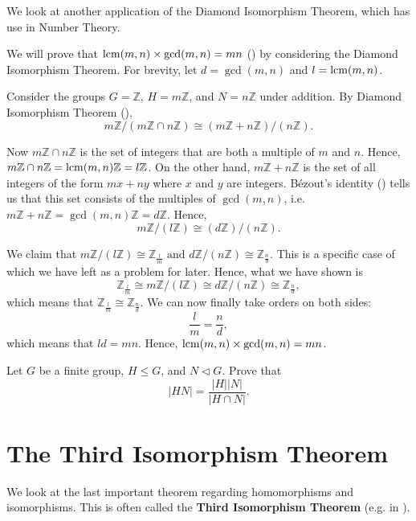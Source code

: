 We look at another application of the Diamond Isomorphism Theorem, which has use in Number Theory.
\begin{example}
    We will prove that $\mathrm{lcm}(m,n)\times\gcd(m,n) = mn$ () by considering the Diamond Isomorphism Theorem. For brevity, let $d = \gcd(m,n)$ and $l = \mathrm{lcm}(m,n)$.

    Consider the groups $G = \mathbb{Z}$, $H = m\mathbb{Z}$, and $N = n\mathbb{Z}$ under addition. By Diamond Isomorphism Theorem (),
    \[
        m\mathbb{Z}/(m\mathbb{Z} \cap n\mathbb{Z}) \cong (m\mathbb{Z} + n\mathbb{Z})/(n\mathbb{Z}).
    \]

    Now $m\mathbb{Z} \cap n\mathbb{Z}$ is the set of integers that are both a multiple of $m$ and $n$. Hence, $m\mathbb{Z} \cap n\mathbb{Z} = \mathrm{lcm}(m,n)\mathbb{Z} = l\mathbb{Z}$. On the other hand, $m\mathbb{Z} + n\mathbb{Z}$ is the set of all integers of the form $mx+ny$ where $x$ and $y$ are integers. B\'{e}zout's identity () tells us that this set consists of the multiples of $\gcd(m,n)$, i.e. $m\mathbb{Z} + n\mathbb{Z} = \gcd(m,n)\mathbb{Z} = d\mathbb{Z}$. Hence,
    \[
        m\mathbb{Z}/(l\mathbb{Z}) \cong (d\mathbb{Z})/(n\mathbb{Z}).
    \]

    We claim that $m\mathbb{Z} / (l\mathbb{Z}) \cong \mathbb{Z}_{\frac lm} \text{ and } d\mathbb{Z} / (n\mathbb{Z}) \cong \mathbb{Z}_{\frac nd}$. This is a specific case of  which we have left as a problem for later. Hence, what we have shown is
    \[
    \mathbb{Z}_{\frac lm} \cong m\mathbb{Z}/(l\mathbb{Z}) \cong d\mathbb{Z}/(n\mathbb{Z}) \cong \mathbb{Z}_{\frac nd},
    \]
    which means that $\mathbb{Z}_{\frac lm} \cong \mathbb{Z}_{\frac nd}$. We can now finally take orders on both sides:
    \[
        \frac{l}{m} = \frac{n}{d},
    \]
    which means that $ld = mn$. Hence, $\mathrm{lcm}(m,n)\times\gcd(m,n) = mn$.
\end{example}

\begin{exercise}\label{exercise-order-of-subgroup-product}
    Let $G$ be a finite group, $H \leq G$, and $N \lhd G$. Prove that
    \[
        |HN| = \frac{|H||N|}{|H \cap N|}.
    \]
\end{exercise}

\section{The Third Isomorphism Theorem}
We look at the last important theorem regarding homomorphisms and isomorphisms. This is often called the \textbf{Third Isomorphism Theorem} (e.g. in \cite{cohn_1982, hungerford_1980}).

